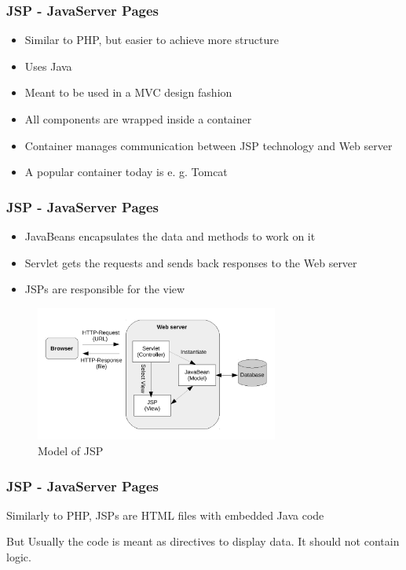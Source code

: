 \documentclass[9pt]{beamer}
\begin{document}
\begin{frame}
\frametitle<presentation>{JSP - JavaServer Pages}

  \begin{itemize}
    \item Similar to PHP, but easier to achieve more structure
    \item Uses Java
    \item Meant to be used in a MVC design fashion
    \item All components are wrapped inside a container
    \item Container manages communication between JSP technology and Web server
    \item A popular container today is e. g. Tomcat
  \end{itemize}
\end{frame}

\begin{frame}
\frametitle<presentation>{JSP - JavaServer Pages}

 \begin{itemize}
    \item JavaBeans encapsulates the data and methods to work on it
    \item Servlet gets the requests and sends back responses to the Web server
    \item JSPs are responsible for the view
  \end{itemize}
  
  \begin{figure}[h]
    \centerline{\includegraphics[width=8cm]{pics/jspMVC.pdf}}
    \caption{Model of JSP}
    \label{fig-jspMvc}
\end{figure}
\end{frame}

\begin{frame}
\frametitle<presentation>{JSP - JavaServer Pages}

  Similarly to PHP, JSPs are HTML files with embedded Java code
  
  \begin{alertblock}{But}
  Usually the code is meant as directives to display data. It should not contain logic.
  \end{alertblock}
\end{frame}
\end{document}
